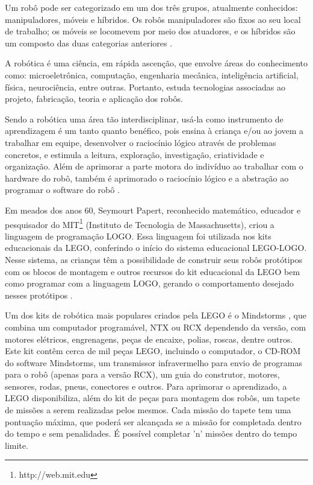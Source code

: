 Um robô pode ser categorizado em um dos três grupos, atualmente conhecidos: manipuladores, móveis e híbridos. Os robôs manipuladores são fixos ao seu local de trabalho; os móveis se locomevem por meio dos atuadores, e os híbridos são um composto das duas categorias anteriores  .

A robótica é uma ciência, em rápida ascenção, que envolve áreas do conhecimento como: microeletrônica, computação, engenharia mecânica, inteligência artificial, física, neurociência, entre outras. Portanto, estuda tecnologias associadas ao projeto, fabricação, teoria e aplicação dos robôs.
	
Sendo a robótica uma área tão interdisciplinar, usá-la como instrumento de aprendizagem é um tanto quanto benéfico, pois ensina à criança e/ou ao jovem a trabalhar em equipe, desenvolver o raciocínio lógico através de problemas concretos, e estimula a leitura, exploração, investigação, criatividade e organização. Além de aprimorar a parte motora do indivíduo ao trabalhar com o hardware do robô, também é aprimorado o raciocínio lógico e a abstração ao programar o software do robô \cite{da2009roboeduc}. 

Em meados dos anos 60, Seymourt Papert, reconhecido matemático, educador e pesquisador do MIT\footnote{http://web.mit.edu} (Instituto de Tecnologia de Massachusetts), criou a linguagem de programação LOGO. Essa linguagem foi utilizada nos kits educacionais da LEGO, conferindo o início do sistema educacional LEGO-LOGO. Nesse sistema, as crianças têm a possibilidade de construir seus robôs protótipos com os blocos de montagem e outros recursos do kit educacional da LEGO bem como programar com a linguagem LOGO, gerando o comportamento desejado nesses protótipos \cite{da2009roboeduc}.

Um dos kits de robótica mais populares criados pela LEGO é o Mindstorms \cite{da2009roboeduc}, que combina um computador programável, NTX ou RCX dependendo da versão, com motores elétricos, engrenagens, peças de encaixe, polias, roscas, dentre outros. Este kit contêm cerca de mil peças LEGO, incluindo o computador, o CD-ROM do software Mindstorms, um transmissor infravermelho para envio de programas para o robô (apenas para a versão RCX), um guia do construtor, motores, sensores, rodas, pneus, conectores e outros. Para aprimorar o aprendizado, a LEGO disponibiliza, além do kit de peças para montagem dos robôs, um tapete de missões a serem realizadas pelos mesmos. Cada missão do tapete tem uma pontuação máxima, que poderá ser alcançada se a missão for completada dentro do tempo e sem penalidades. É possível completar 'n' missões dentro do tempo limite.

